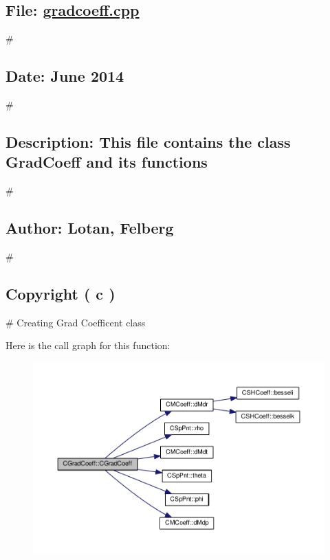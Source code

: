 \subsection*{File\-: \hyperlink{gradcoeff_8cpp}{gradcoeff.\-cpp}}

\# \subsection*{Date\-: June 2014}

\# \subsection*{Description\-: This file contains the class Grad\-Coeff and its functions}

\# \subsection*{Author\-: Lotan, Felberg}

\# \subsection*{Copyright ( c )}

\# Creating Grad Coefficent class 

Here is the call graph for this function\-:
\nopagebreak
\begin{figure}[H]
\begin{center}
\leavevmode
\includegraphics[width=350pt]{classCGradCoeff_a41d80b3998f3dfe2a9111ab9f00855fb_cgraph}
\end{center}
\end{figure}




